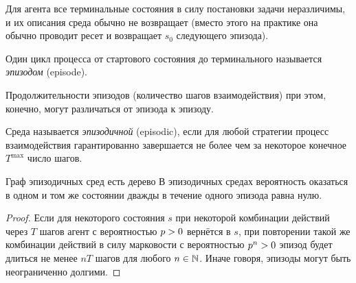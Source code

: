 \begin{remark}
Для агента все терминальные состояния в силу постановки задачи неразличимы, и их описания среда обычно не возвращает (вместо этого на практике она обычно проводит ресет и возвращает $s_0$ следующего эпизода).
\end{remark}

\begin{definition}
Один цикл процесса от стартового состояния до терминального называется \emph{эпизодом} (episode).
\end{definition}

Продолжительности эпизодов (количество шагов взаимодействия) при этом, конечно, могут различаться от эпизода к эпизоду.

\begin{definition}
Среда называется \emph{эпизодичной} (episodic), если для любой стратегии процесс взаимодействия гарантированно завершается не более чем за некоторое конечное $T^{\max}$ число шагов.
\end{definition}

\begin{theoremBox}[label=th:episodicmdpistree]{Граф эпизодичных сред есть дерево}
В эпизодичных средах вероятность оказаться в одном и том же состоянии дважды в течение одного эпизода равна нулю.
\begin{proof}
Если для некоторого состояния $s$ при некоторой комбинации действий через $T$ шагов агент с вероятностью $p \HM> 0$ вернётся в $s$, при повторении такой же комбинации действий в силу марковости с вероятностью $p^n \HM> 0$ эпизод будет длиться не менее $nT$ шагов для любого $n \HM\in \mathbb{N}$. Иначе говоря, эпизоды могут быть неограниченно долгими. 
\end{proof}
\end{theoremBox}

